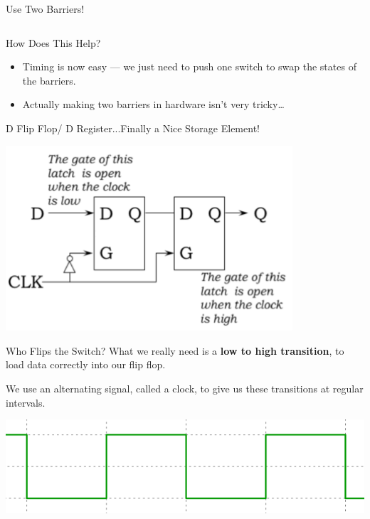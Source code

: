 \documentclass[aspectratio=169, 11pt, handout]{beamer}
\begin{document}
\begin{frame}{Use Two Barriers!}
\begin{columns}
\begin{column}{0.5\textwidth}
\begin{center}
\end{center}
\end{column} 
 \end{columns}   
\end{frame}

\begin{frame}{How Does This Help?}
    
    \begin{itemize}
        \item Timing is now easy --- we just need to push one switch to swap the states of the barriers.\pause
        \item Actually making two barriers in hardware isn't very tricky\ldots
    \end{itemize}
\end{frame}

\begin{frame}{D Flip Flop/ D Register...Finally a Nice Storage Element!}
    \begin{center}
        \includegraphics[width=0.8\textwidth]{ff_latch.png}
    \end{center}
\end{frame}

\begin{frame}{Who Flips the Switch?}
   What we really need is a \textbf{low to high transition}, to load data correctly into our flip flop.\\ \pause
   
   We use an alternating signal, called a clock, to give us these transitions at regular intervals.\pause
   
   \begin{center}
       \includegraphics[width=\textwidth]{Waveforms.svg.png}
   \end{center}
    
\end{frame}
\end{document}

